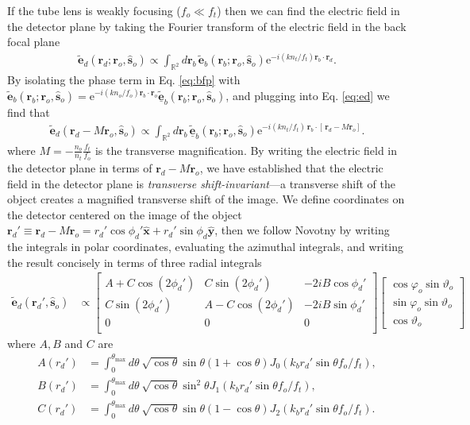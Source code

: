 \documentclass[11pt]{article}
\newcommand{\me}{\mathrm{e}}
\providecommand{\mb}[1]{\mathbf{#1}}
\providecommand{\ro}[1]{\mathbf{\mathbf{r}}_o}
\providecommand{\so}[1]{\mathbf{\hat{s}}_o}
\providecommand{\rb}[1]{\mathbf{r}_b}
\providecommand{\rd}[1]{\mathbf{r}_d}
\providecommand{\mh}[1]{\mathbf{\hat{#1}}}
\begin{document}
If the tube lens is weakly focusing ($f_o \ll f_t$) then we can find the
electric field in the detector plane by taking the Fourier transform of the
electric field in the back focal plane
\begin{align}
  \mb{\tilde{e}}_d(\rd{}; \ro{}, \so{}) \propto \int_{\mathbb{R}^2} d\rb{}\, \tilde{\mb{e}}_b(\rb{}; \ro{}, \so{})\me^{-i (kn_t/f_t) \rb{} \cdot \rd{}}. \label{eq:ed}
\end{align}
By isolating the phase term in Eq. \ref{eq:bfp} with
$\mb{\tilde{e}}_b(\rb{};\ro{}, \so{}) = \me^{-i(kn_o/f_o)\rb{}\cdot\ro{}}
\tilde{\underline{\mb{e}}}_b(\rb{};\ro{}, \so{})$, and plugging into Eq. \ref{eq:ed} we find
that 
\begin{align}
  \mb{\tilde{e}}_d(\rd{} - M\ro{}, \so{}) \propto \int_{\mathbb{R}^2} d\rb{}\, \tilde{\underline{\mb{e}}}_b(\rb{}; \ro{}, \so{})\me^{-i (kn_t/f_t)\, \rb{} \cdot [\,\rd{} - M\ro{}]}.
\end{align}
where $M = -\frac{n_o}{n_t}\frac{f_t}{f_o}$ is the transverse magnification.  By
writing the electric field in the detector plane in terms of $\rd{} - M\ro{}$,
we have established that the electric field in the detector plane is
\textit{transverse shift-invariant}---a transverse shift of the object creates a
magnified transverse shift of the image. We define coordinates on the detector
centered on the image of the object
$\rd{}' \equiv \rd{} - M\ro{} = r_d'\cos\phi_d'\mh{x} + r_d'\sin\phi_d\mh{y}$,
then we follow Novotny \cite{nov2006} by writing the integrals in polar
coordinates, evaluating the azimuthal integrals, and writing the result
concisely in terms of three radial integrals
\begin{align}
  \tilde{\mb{e}}_d(\rd{}', \so{}) &\propto
  \begin{bmatrix}
    A + C\cos(2\phi_d') & C\sin(2\phi_d') & -2iB\cos\phi_d'\\
    C\sin(2\phi_d') & A - C\cos(2\phi_d') & -2iB\sin\phi_d'\\
    0&0&0\\
  \end{bmatrix}
  \begin{bmatrix}
    \cos\varphi_o\sin\vartheta_o\\
    \sin\varphi_o\sin\vartheta_o\\
    \cos\vartheta_o
  \end{bmatrix}\label{eq:elec}
\end{align}
where $A, B$ and $C$ are
\begin{align}
  A(r_d') &= \int_0^{\theta_{\text{max}}}d\theta\ \sqrt{\cos\theta}\sin\theta(1+\cos\theta)J_0(k_b r_d'\sin\theta f_o/f_t),\\%
  B(r_d') &= \int_0^{\theta_{\text{max}}}d\theta\ \sqrt{\cos\theta}\sin^2\theta J_1(k_b r_d'\sin\theta f_o/f_t),\\%
  C(r_d') &= \int_0^{\theta_{\text{max}}}d\theta\ \sqrt{\cos\theta}\sin\theta(1-\cos\theta)J_2(k_b r_d'\sin\theta f_o/f_t).%
\end{align}
\end{document}
